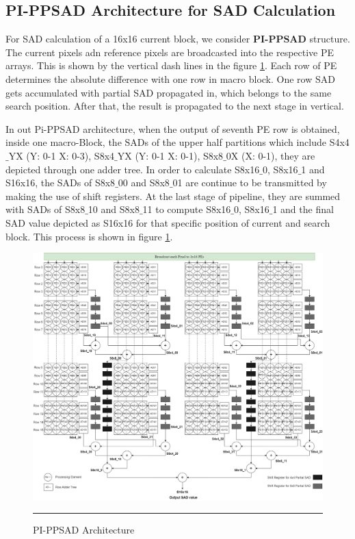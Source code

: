 \subsection{PI-PPSAD Architecture for SAD Calculation}

For SAD calculation of a 16x16 current block, we consider \textbf{PI-PPSAD} structure. The current pixels adn reference pixels are broadcasted into the respective PE arrays. This is shown by the vertical dash lines in the figure \ref{fig:pippsad}. Each row of PE determines the absolute difference with one row in macro block. One row SAD gets accumulated with partial SAD propagated in, which belongs to the same search position. After that, the result is propagated to the next stage in vertical.

In out Pi-PPSAD architecture, when the output of seventh PE row is obtained, inside one macro-Block, the SADs of the upper half partitions which include S4x4$\_$YX (Y: 0-1 X: 0-3), S8x4$\_$YX (Y: 0-1 X: 0-1), S8x8$\_$0X (X: 0-1), they are depicted through one adder tree. In order to calculate S8x16$\_$0, S8x16$\_$1 and S16x16, the SADs of S8x8$\_$00 and S8x8$\_$01 are continue to be transmitted by making the use of shift registers. At the last stage of pipeline, they are summed with SADs of S8x8$\_$10 and S8x8$\_$11 to compute S8x16$\_$0, S8x16$\_$1 and the final SAD value depicted as S16x16 for that specific position of current and search block. This process is shown in figure \ref{fig:pippsad}.

\begin{figure}[htbp]
	\centering
	\includegraphics[width = 5.5in]{./Figures/PIPPSAD.png}
	\rule{35em}{0.5pt}
	\caption{PI-PPSAD Architecture}
	\label{fig:pippsad}
\end{figure}

